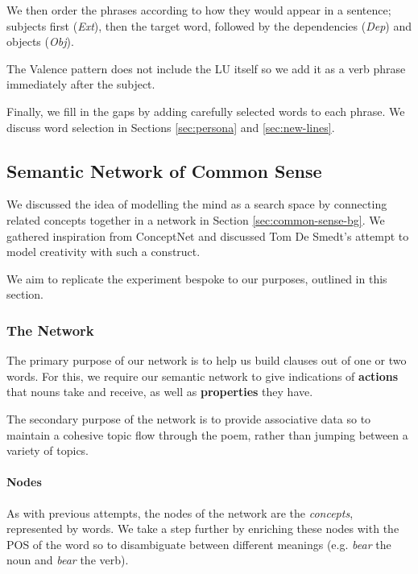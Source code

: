 We then order the phrases according to how they would appear in a sentence; subjects first (\textit{Ext}), then the target word, followed by the dependencies (\textit{Dep}) and objects (\textit{Obj}).

The Valence pattern does not include the LU itself so we add it as a verb phrase immediately after the subject.

Finally, we fill in the gaps by adding carefully selected words to each phrase. We discuss word selection in Sections  \ref{sec:persona} and \ref{sec:new-lines}.

\subsection{Semantic Network of Common Sense}
\label{sec:common-sense}
We discussed the idea of modelling the mind as a search space by connecting related concepts together in a network in Section \ref{sec:common-sense-bg}. We gathered inspiration from ConceptNet and discussed Tom De Smedt's attempt to model creativity with such a construct.
 
We aim to replicate the experiment bespoke to our purposes, outlined in this section.
 
\subsubsection{The Network}
The primary purpose of our network is to help us build clauses out of one or two words. For this, we require our semantic network to give indications of \textbf{actions} that nouns take and receive, as well as \textbf{properties} they have.

The secondary purpose of the network is to provide associative data so to maintain a cohesive topic flow through the poem, rather than jumping between a variety of topics. 

\paragraph{Nodes}
As with previous attempts, the nodes of the network are the \textit{concepts}, represented by words. We take a step further by enriching these nodes with the POS of the word so to disambiguate between different meanings (e.g. \textit{bear} the noun and \textit{bear} the verb).

